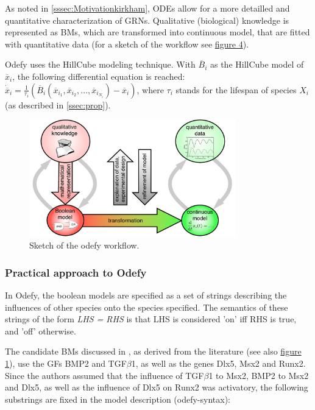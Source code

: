 \documentclass[11pt]{article}
\begin{document}
As noted in \ref{sssec:Motivationkirkham}, ODEs allow for a more detailled and quantitative characterization of GRNs. Qualitative (biological) knowledge is represented as BMs, which are transformed into continuous model, that are fitted with quantitative data (for a sketch of the workflow see \hyperref[odefy_workflow]{figure 4}).

Odefy uses the HillCube modeling technique. With $\overline{B}_{i}$ as the HillCube model of $\overline{x}_{i}$, the following differential equation is reached: $\dot{\overline{x}}_{i} = \frac{1}{\tau_{i}} (\overline{B}_{i} (\overline{x}_{i_{1}}, \overline{x}_{i_{2}},..., \overline{x}_{i_{N_{i}}} ) - \overline{x}_{i} )$, where $\tau_{i}$ stands for the lifespan of species $X_{i}$ (as described in \ref{ssec:prop}).

\begin{figure}[!hbt]
  \centering
  \includegraphics[width=0.8\textwidth]{odefy.jpg}
  \caption{\label{odefy_workflow} Sketch of the odefy workflow.}
\end{figure}


\subsubsection{Practical approach to Odefy} \label{sssec:Pracapproach}
In Odefy, the boolean models are specified as a set of strings describing the influences of other species onto the species specified.
The semantics of these strings of the form \textit{LHS = RHS} is that LHS is considered 'on' iff RHS is true, and 'off' otherwise.

The candidate BMs discussed in \cite{Kirkham}, as derived from the literature (see also \hyperref[GRNs]{figure 1}), use the GFs
BMP2 and TGF$\beta$1, as well as the genes Dlx5, Msx2 and Runx2.
Since the authors assumed that the influence of TGF$\beta$1 to Msx2, BMP2 to Msx2 and Dlx5, as well as the influence of Dlx5 on Runx2 was activatory, the following substrings are fixed in the model description (odefy-syntax):
\end{document}
